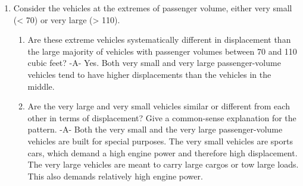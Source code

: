 \documentclass[]{article}
\providecommand{\tightlist}{%
  \setlength{\itemsep}{0pt}\setlength{\parskip}{0pt}}
\begin{document}
\begin{enumerate}
\def\labelenumi{\arabic{enumi}.}
\setcounter{enumi}{2}
\tightlist
\item
  Consider the vehicles at the extremes of passenger volume, either very
  small (\textless{} 70) or very large (\textgreater{} 110).

  \begin{enumerate}
  \def\labelenumii{\alph{enumii}.}
  \tightlist
  \item
    Are these extreme vehicles systematically different in displacement
    than the large majority of vehicles with passenger volumes between
    70 and 110 cubic feet? -A- Yes. Both very small and very large
    passenger-volume vehicles tend to have higher displacements than the
    vehicles in the middle.
  \item
    Are the very large and very small vehicles similar or different from
    each other in terms of displacement? Give a common-sense explanation
    for the pattern. -A- Both the very small and the very large
    passenger-volume vehicles are built for special purposes. The very
    small vehicles are sports cars, which demand a high engine power and
    therefore high displacement. The very large vehicles are meant to
    carry large cargos or tow large loads. This also demands relatively
    high engine power.
  \end{enumerate}
\end{enumerate}
\end{document}
